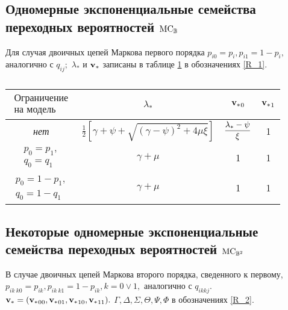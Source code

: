 \subsection{Одномерные экспоненциальные семейства переходных вероятностей $\mathrm{MC}_{\mathbb{B}}$}

Для случая двоичных цепей Маркова первого порядка $p_{i0} = p_{i}, p_{i1} = 1 - p_{i},$ аналогично с $q_{ij};$ $\lambda_\ast$ и ${\mathbf{v}_\ast}$ записаны в таблице \ref{tab:tableFIRST} в обозначениях \eqref{R_1}.
 
\begin{table}[h!]
  \begin{center}
    \caption{ }
    \label{tab:tableFIRST}
    \begin{tabular}{c|c|c|c}
     \toprule
       $\begin{array}{c}
      \textrm{Ограничение}\\
      \textrm{на модель}
      \end{array}$ & $\lambda_\ast$ & ${{\mathbf{v}_\ast}}_0$ & ${{\mathbf{v}_\ast}}_1$\\
      \toprule
      \textit{нет} & $\displaystyle \frac{1}{2} \left[ \gamma + \psi + \sqrt{(\gamma - \psi)^2 + 4 \mu \xi} \right]$ & $\displaystyle \frac{{\lambda_\ast} - \psi}{\xi} $ & 1\\
\midrule
      $\begin{array}{l}
      p_0 = p_1,\\
      q_0 = q_1
      \end{array}$ & $\gamma + \mu$ & 1 & 1\\
\midrule
      $\begin{array}{l}
      p_0 = 1 - p_1,\\
      q_0 = 1 - q_1
      \end{array}$ & $\gamma + \mu$ & 1 & 1\\
\bottomrule
    \end{tabular}
  \end{center}
\end{table}

\subsection{Некоторые одномерные экспоненциальные семейства переходных вероятностей $\mathrm{MC}_{\mathbb{B}^2}$}
\label{EXP_FAM_SECOND}

В случае двоичных цепей Маркова второго порядка, сведенного к первому, $p_{ik \ k0} = p_{ik}, p_{ik \ k1} = 1 - p_{ik}, k = 0 \vee 1,$ аналогично с $q_{ik kj}.$ ${\mathbf{v}_\ast} = ({{\mathbf{v}_\ast}}_{00}, {{\mathbf{v}_\ast}}_{01}, {{\mathbf{v}_\ast}}_{10}, {{\mathbf{v}_\ast}}_{11}).$ $\Gamma, \Delta, \Sigma, \Theta, \Psi, \Phi$ в обозначениях \eqref{R_2}.


